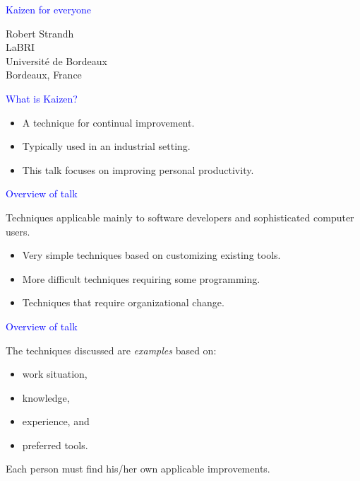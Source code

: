 \documentclass{slides}
\newcommand{\ti}[1]{\begin{center}\Large{\textcolor{blue}{#1}}\end{center}}
\begin{document}
\landscape
\setlength{\oddsidemargin}{1cm}
\setlength{\evensidemargin}{1cm}
\setlength{\marginparwidth}{1cm}
\setlength{\parskip}{0.5cm}
\setlength{\parindent}{0cm}
\begin{slide}\ti{Kaizen for everyone}
\vskip 0.5cm
\begin{center}
Robert Strandh \\
LaBRI \\
Université de Bordeaux \\
Bordeaux, France
\end{center}
\vfill\end{slide}
\begin{slide}\ti{What is Kaizen?}

  \begin{itemize}
  \item A technique for continual improvement.
  \item Typically used in an industrial setting.
  \item This talk focuses on improving personal productivity.
  \end{itemize}

\vfill\end{slide}
\begin{slide}\ti{Overview of talk}

Techniques applicable mainly to software developers and sophisticated
computer users.

  \begin{itemize}
  \item Very simple techniques based on customizing existing tools.
  \item More difficult techniques requiring some programming.
  \item Techniques that require organizational change.
  \end{itemize}

\vfill\end{slide}
\begin{slide}\ti{Overview of talk}

The techniques discussed are \emph{examples} based on:

\begin{itemize}
\item work situation,
\item knowledge,
\item experience, and
\item preferred tools.
\end{itemize}

Each person must find his/her own applicable improvements.

\vfill\end{slide}
\end{document}
